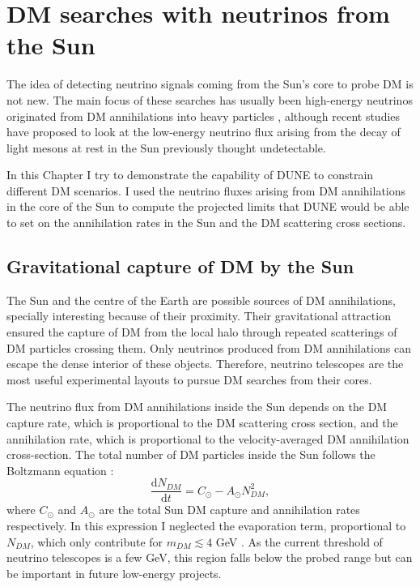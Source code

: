 \chapter{DM searches with neutrinos from the Sun}
\label{chapter:dm_analysis}

The idea of detecting neutrino signals coming from the Sun's core to probe DM is not new. The main focus of these searches has usually been high-energy neutrinos originated from DM annihilations into heavy particles \cite{Silk1985, Srednicki1986, Hagelin1986, Gaisser1986}, although recent studies have proposed to look at the low-energy neutrino flux arising from the decay of light mesons at rest in the Sun \cite{Bernal2012, Rott2012, Rott2015, DUNE2021} previously thought undetectable.

%
In this Chapter I try to demonstrate the capability of DUNE to constrain different DM scenarios. I used the neutrino fluxes arising from DM annihilations in the core of the Sun to compute the projected limits that DUNE would be able to set on the annihilation rates in the Sun and the DM scattering cross sections.

\section{Gravitational capture of DM by the Sun}
\label{sec:B.1}

The Sun and the centre of the Earth are possible sources of DM annihilations, specially interesting because of their proximity. Their gravitational attraction ensured the capture of DM from the local halo through repeated scatterings of DM particles crossing them. Only neutrinos produced from DM annihilations can escape the dense interior of these objects. Therefore, neutrino telescopes are the most useful experimental layouts to pursue DM searches from their cores.

The neutrino flux from DM annihilations inside the Sun depends on the DM capture rate, which is proportional to the DM scattering cross section, and the annihilation rate, which is proportional to the velocity-averaged DM annihilation cross-section. The total number of DM particles inside the Sun follows the Boltzmann equation \cite{Bernal2012}:
\begin{equation}\label{2.1}
	\frac{\mathrm{d} N_{DM}}{\mathrm{d} t} = C_{\odot} - A_{\odot} N_{DM}^{2},
\end{equation}
where $C_{\odot}$ and $A_{\odot}$ are the total Sun DM capture and annihilation rates respectively. In this expression I neglected the evaporation term, proportional to $N_{DM}$, which only contribute for $m_{DM}\lesssim 4$ GeV \cite{Busoni2013}. As the current threshold of neutrino telescopes is a few GeV, this region falls below the probed range but can be important in future low-energy projects.

